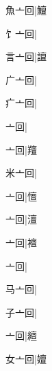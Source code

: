 \begin{multicols}{2}
{{\cjk{}魚亠回}|{\cjk{}鱣}\par
{\cjk{}饣亠回}|{}\par
{\cjk{}言亠回}|{\cjk{}譠}\par
{\cjk{}广亠回}|{}\par
{\cjk{}疒亠回}|{}\par
{亠回}|{}\par
{亠回}|{\cjk{}羶}\par
{\cjk{}米亠回}|{}\par
{亠回}|{\cjk{}憻}\par
{亠回}|{\cjk{}澶}\par
{亠回}|{\cjk{}襢}\par
{亠回}|{}\par
{\cjk{}马亠回}|{}\par
{\cjk{}子亠回}|{}\par
{亠回}|{\cjk{}繵}\par
{\cjk{}女亠回}|{\cjk{}嬗}\par
}
\end{multicols}
